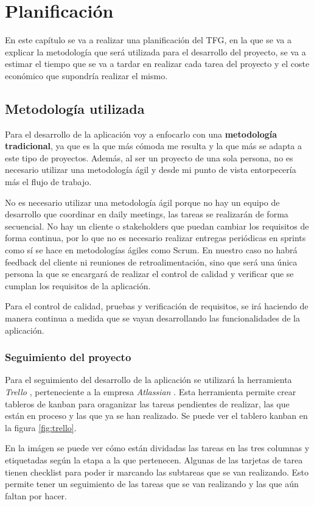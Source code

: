 \chapter{Planificación}
En este capítulo se va a realizar una planificación del TFG, en la que se
va a explicar la metodología que será utilizada para el desarrollo del proyecto,
se va a estimar el tiempo que se va a tardar en realizar cada tarea del proyecto
y el coste económico que supondría realizar el mismo.

\section{Metodología utilizada}
Para el desarrollo de la aplicación voy a enfocarlo con una \textbf{metodología
tradicional}, ya que es la que más cómoda me resulta y la que más se adapta
a este tipo de proyectos. Además, al ser un proyecto de una sola persona, no es
necesario utilizar una metodología ágil y desde mi punto de vista entorpecería
más el flujo de trabajo.

No es necesario utilizar una metodología ágil porque no hay un equipo de
desarrollo que coordinar en daily meetings, las tareas se realizarán de forma secuencial.
No hay un cliente o stakeholders que puedan cambiar los requisitos de forma
continua, por lo que no es necesario realizar entregas periódicas en sprints como
sí se hace en metodologías ágiles como Scrum. En nuestro caso no habrá feedback del
cliente ni reuniones de retroalimentación, sino que será una única persona la que
se encargará de realizar el control de calidad y verificar que se cumplan los
requisitos de la aplicación.

Para el control de calidad, pruebas y verificación de requisitos, se irá haciendo
de manera continua a medida que se vayan desarrollando las funcionalidades de la
aplicación.

\subsection{Seguimiento del proyecto}
Para el seguimiento del desarrollo de la aplicación se utilizará la herramienta
\textit{Trello} \cite{trello}, perteneciente a la empresa \textit{Atlassian} \cite{atlassian}.
Esta herramienta permite crear tableros de kanban para oraganizar
las tareas pendientes de realizar, las que están en proceso y las que ya se han
realizado. Se puede ver el tablero kanban en la figura \ref{fig:trello}.

En la imágen se puede ver cómo están dividadas las tareas en las tres columnas y
etiquetadas según la etapa a la que pertenecen. Algunas de las tarjetas de tarea
tienen checklist para poder ir marcando las subtareas que se van realizando. Esto
permite tener un seguimiento de las tareas que se van realizando y las que aún
faltan por hacer.

